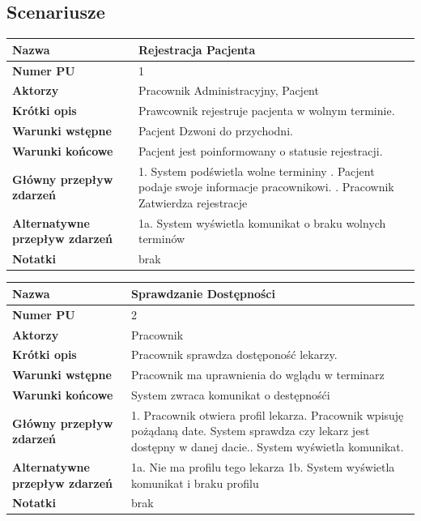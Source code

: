 \documentclass{article}
\begin{document}
	\subsection*{Scenariusze}
		\begin{tabular}{|m{10em}|m{30em}|}
	\hline
	\textbf{Nazwa} & Rejestracja Pacjenta \\
	\hline
	\textbf{Numer PU} & 1 \\
	\hline
	\textbf{Aktorzy} & Pracownik Administracyjny, Pacjent \\
	\hline
	\textbf{Krótki opis} & Prawcownik rejestruje pacjenta w wolnym terminie. \\
	\hline
	\textbf{Warunki wstępne} & Pacjent Dzwoni do przychodni. \\
	\hline
	\textbf{Warunki końcowe} & Pacjent jest poinformowany o statusie rejestracji.\\
	\hline
	\textbf{Główny przepływ zdarzeń} & 
		1. System podświetla wolne termininy \newline
		2. Pacjent podaje swoje informacje pracownikowi. \newline
		3. Pracownik Zatwierdza rejestracje   \\
	\hline
	\textbf{Alternatywne przepływ zdarzeń} & 1a. System wyświetla komunikat o braku wolnych terminów\\
	\hline 
	\textbf{Notatki} & brak \\
	\hline
	\end{tabular}
	
    \vspace{1cm}
    
    \begin{tabular}{|m{10em}|m{30em}|}
    	\hline
    	\textbf{Nazwa} & Sprawdzanie Dostępności  \\
    	\hline
    	\textbf{Numer PU} & 2 \\
    	\hline
    	\textbf{Aktorzy} & Pracownik \\
    	\hline
    	\textbf{Krótki opis} & Pracownik sprawdza dostęponość lekarzy. \\
    	\hline
    	\textbf{Warunki wstępne} & Pracownik ma uprawnienia do wglądu w terminarz \\
    	\hline
    	\textbf{Warunki końcowe} &  System zwraca komunikat o  destępnośći\\
    	\hline
    	\textbf{Główny przepływ zdarzeń} & 
    	1. Pracownik otwiera profil lekarza\newline
    	2. Pracownik wpisuję pożądaną date.\newline
    	3  System sprawdza czy lekarz jest dostępny w danej dacie.\newline
    	4. System wyświetla komunikat.\\
    	\hline
    	\textbf{Alternatywne przepływ zdarzeń} & 1a. Nie ma profilu tego lekarza \newline
    											 1b. System wyświetla komunikat i braku profilu\\
    	\hline 
    	\textbf{Notatki} & brak \\
    	\hline
    \end{tabular}
    
\end{document}

